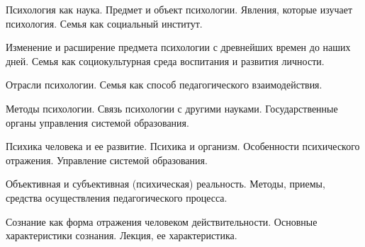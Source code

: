 \documentclass[
	14pt,
	a4paper,
	]
	{scrartcl}
\begin{document}
\shapk
{}
\setcounter{zad}{0}

\vfill
\z 	Психология как наука. Предмет и объект психологии. Явления, которые изучает психология.
 \vfill
\z 	Семья как социальный институт.
 \vfill

\vfill

\newpage


\shapk
{}
\setcounter{zad}{0}

\vfill
\z 	Изменение и расширение предмета психологии с древнейших времен до наших дней.
 \vfill
\z 	Семья как социокультурная среда воспитания и развития личности.
 \vfill

\vfill

\newpage


\shapk
{}
\setcounter{zad}{0}

\vfill
\z 	Отрасли психологии.
 \vfill
\z 	Семья как способ педагогического взаимодействия.
 \vfill

\vfill

\newpage


\shapk
{}
\setcounter{zad}{0}

\vfill
\z 	Методы психологии. Связь психологии с другими науками.
 \vfill
\z 	Государственные органы управления системой образования.
 \vfill

\vfill

\newpage


\shapk
{}
\setcounter{zad}{0}

\vfill
\z 	Психика человека и ее развитие. Психика и организм. Особенности психического отражения.
 \vfill
\z 	Управление системой образования.
 \vfill

\vfill

\newpage


\shapk
{}
\setcounter{zad}{0}

\vfill
\z 	Объективная и субъективная (психическая) реальность.
 \vfill
\z 	Методы, приемы, средства осуществления педагогического процесса.
 \vfill

\vfill

\newpage


\shapk
{}
\setcounter{zad}{0}

\vfill
\z 	Сознание как форма отражения человеком действительности. Основные характеристики сознания.
 \vfill
\z 	Лекция, ее характеристика.
 \vfill

\vfill
\end{document}
